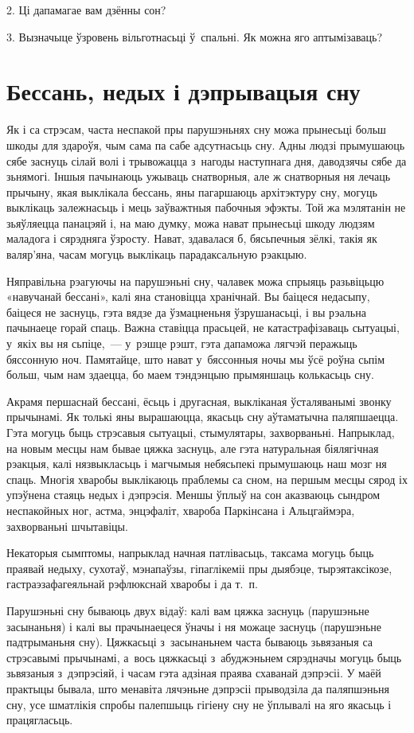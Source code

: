 2. Ці дапамагае вам дзённы сон?

3. Вызначыце ўзровень вільготнасьці ў~спальні. Як можна яго аптымізаваць?


\section{Бессань, недых і дэпрывацыя сну}

Як і са стрэсам, часта неспакой пры парушэньнях сну можа прынесьці больш шкоды для здароўя, чым сама па сабе адсутнасьць сну. Адны людзі прымушаюць сябе заснуць сілай волі і трывожацца з~нагоды наступнага дня, даводзячы сябе да зьнямогі. Іншыя пачынаюць ужываць снатворныя, але ж снатворныя ня лечаць прычыну, якая выклікала бессань, яны пагаршаюць архітэктуру сну, могуць выклікаць залежнасьць і мець заўважтныя пабочныя эфэкты. Той жа мэлятанін не зьяўляецца панацэяй і, на маю думку, можа нават прынесьці шкоду людзям маладога і сярэдняга ўзросту. Нават, здавалася б, бясьпечныя зёлкі, такія як валяр'яна, часам могуць выклікаць парадаксальную рэакцыю.

Няправільна рэагуючы на парушэньні сну, чалавек можа спрыяць разьвіцьцю «навучанай бессані», калі яна становіцца хранічнай. Вы баіцеся недасыпу, баіцеся не заснуць, гэта вядзе да ўзмацненьня ўзрушанасьці, і вы рэальна пачынаеце горай спаць. Важна ставіцца прасьцей, не катастрафізаваць сытуацыі, у~якіх вы ня сьпіце,~--- у~рэшце рэшт, гэта дапаможа лягчэй перажыць бяссонную ноч. Памятайце, што нават у~бяссонныя ночы мы ўсё роўна сьпім больш, чым нам здаецца, бо маем тэндэнцыю прымяншаць колькасьць сну.

Акрамя першаснай бессані, ёсьць і другасная, выкліканая ўсталяванымі звонку прычынамі. Як толькі яны вырашаюцца, якасьць сну аўтаматычна паляпшаецца. Гэта могуць быць стрэсавыя сытуацыі, стымулятары, захворваньні. Напрыклад, на новым месцы нам бывае цяжка заснуць, але гэта натуральная біялягічная рэакцыя, калі нязвыкласьць і магчымыя небясьпекі прымушаюць наш мозг ня спаць. Многія хваробы выклікаюць праблемы са сном, на першым месцы сярод іх упэўнена стаяць недых і дэпрэсія. Меншы ўплыў на сон аказваюць сындром неспакойных ног, астма, энцэфаліт, хвароба Паркінсана і Альцгаймэра, захворваньні шчытавіцы. 

Некаторыя сымптомы, напрыклад начная патлівасьць, таксама могуць быць праявай недыху, сухотаў, мэнапаўзы, гіпаглікеміі пры дыябэце, тырэятаксікозе, гастраэзафагеяльнай рэфлюкснай хваробы і да т.~п.

Парушэньні сну бываюць двух відаў: калі вам цяжка заснуць (парушэньне засынаньня) і калі вы прачынаецеся ўначы і ня можаце заснуць (парушэньне падтрыманьня сну). Цяжкасьці з~засынаньнем часта бываюць зьвязаныя са стрэсавымі прычынамі, а~вось цяжкасьці з~абуджэньнем сярэдначы могуць быць зьвязаныя з~дэпрэсіяй, і часам гэта адзіная праява схаванай дэпрэсіі. У маёй практыцы бывала, што менавіта лячэньне дэпрэсіі прыводзіла да паляпшэньня сну, усе шматлікія спробы палепшыць гігіену сну не ўплывалі на яго якасьць і працягласьць.

